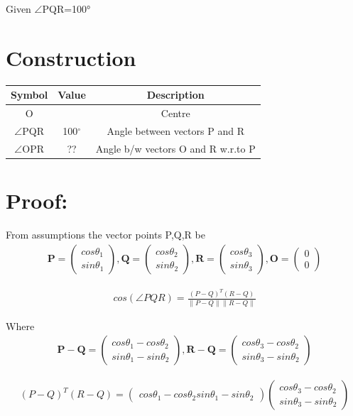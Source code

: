 \documentclass[journal,10pt,twocolumn]{article}
\providecommand{\norm}[1]{\left\lVert#1\right\rVert}
\let\vec\mathbf
\newcommand{\myvec}[1]{\ensuremath{\begin{pmatrix}#1\end{pmatrix}}}
\begin{document}
{Given  $\angle$PQR=100°





\section*{ Construction}






{
\setlength\extrarowheight{1pt}


\begin{tabular}{|c|c|c|}
 \hline
 \textbf{Symbol}&\textbf{Value}&\textbf{Description}\\
 \hline
 O&&Centre\\
 \hline
 $\angle$PQR&100$^\circ$&Angle between vectors P and R\\
 \hline
 $\angle$OPR&??&Angle b/w vectors O and R w.r.to P\\
 \hline
 
\end{tabular}

{


\section*{Proof:}
From assumptions the vector points P,Q,R be
\begin{eqnarray}
 \vec{P} = \myvec{cos\theta_1\\sin\theta_1},
 \vec{Q} = \myvec{cos\theta_2\\sin\theta_2},
 \vec{R} = \myvec{cos\theta_3\\sin\theta_3},
 \vec{O} = \myvec{0\\0}
\end{eqnarray}

\begin{align}
 cos(\angle PQR) = \frac{(P-Q)^T(R-Q)}{\norm{P-Q}\norm{R-Q}}
 \label{pf2-eq-1}
\end{align}

Where
 \begin{eqnarray}
 \vec{P-Q} = \myvec{cos\theta_1 - cos\theta_2\\sin\theta_1 - sin\theta_2},
 \vec{R-Q} = \myvec{cos\theta_3 - cos\theta_2\\sin\theta_3 - sin\theta_2}
\end{eqnarray}
 

\begin{eqnarray*}
 (P-Q)^T(R-Q)=\myvec{cos\theta_1 - cos\theta_2  sin\theta_1 - sin\theta_2}
 \myvec{cos\theta_3 - cos\theta_2\\sin\theta_3 - sin\theta_2}
\end{eqnarray*}

}}}
\end{document}
